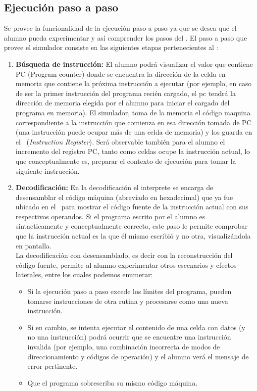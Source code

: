 \subsection{Ejecución paso a paso}

Se provee la funcionalidad de la ejecución paso a paso ya que se desea que el alumno pueda experimentar y así comprender los pasos del \ciclo. El paso a paso que provee el simulador consiste en las siguientes etapas pertenecientes al \ciclo:

\begin{enumerate}
\item \textbf{Búsqueda de instrucción:} El alumno podrá visualizar el valor que contiene PC (Program counter) donde se encuentra la dirección de la celda en memoria que contiene la próxima instrucción a ejecutar (por ejemplo, en caso de ser la primer instrucción del programa recién cargado, el pc tendrá la dirección de memoria elegida por el alumno para iniciar el cargado del programa en memoria). El simulador, toma de la memoria el código maquina correspondiente a la instrucción que comienza en esa dirección tomada de PC (una instrucción puede ocupar más de una celda de memoria) y los guarda en el \IR\ (\textit{Instruction Register}). Será observable también para el alumno el incremento del registro PC, tanto como celdas ocupe la instrucción actual, lo que conceptualmente es, preparar el contexto de ejecución para tomar la siguiente instrucción.

\item  \textbf{Decodificación:}
En la decodificación el interprete se encarga de desensamblar el código máquina (abreviado en hexadecimal) que ya fue ubicado en el \IR\ para mostrar el código fuente de la instrucción actual con sus respectivos operandos. Si el programa escrito por el alumno es sintacticamente y conceptualmente correcto, este paso le permite comprobar que la instrucción actual es la que él mismo escribió y no otra, visualizándola en pantalla. \\

La decodificación con desensamblado, es decir con la reconstrucción del código fuente, permite al alumno experimentar otros escenarios y efectos laterales, entre los cuales podemos enumerar:

\begin{itemize}
\item Si la ejecución paso a paso excede los límites del programa, pueden tomarse instrucciones de otra rutina y procesarse como una nueva instrucción.
\item Si en cambio, se intenta ejecutar el contenido de una celda con datos (y no una instrucción) podrá ocurrir que se encuentre una instrucción invalida (por ejemplo, una combinación incorrecta de modos de direccionamiento y códigos de operación) y el alumno verá el mensaje de error pertinente.
\item Que el programa sobrescriba su mismo código máquina.
\end{itemize}


\end{enumerate}
